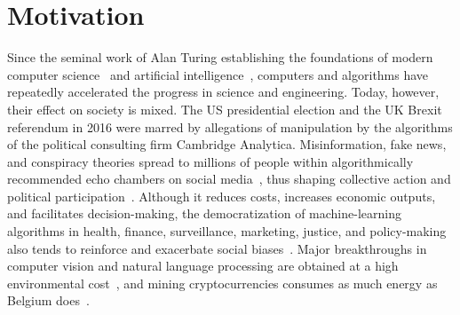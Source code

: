 \section{Motivation}
\label{in:sec:motivation}

Since the seminal work of Alan Turing establishing the foundations of modern computer science~\citep{turing1937computable} and artificial intelligence~\citep{turing2009computing}, computers and algorithms have repeatedly accelerated the progress in science and engineering.
Today, however, their effect on society is mixed.
The US presidential election and the UK Brexit referendum in 2016 were marred by allegations of manipulation by the algorithms of the political consulting firm Cambridge Analytica.
Misinformation, fake news, and conspiracy theories spread to millions of people within algorithmically recommended echo chambers on social media~\citep{kumar2016disinformation,garimella2018political,ribeiro2020auditing,cinelli2021echo}, thus shaping collective action and political participation~\citep{margetts2015political}.
Although it reduces costs, increases economic outputs, and facilitates decision-making, the democratization of machine-learning algorithms in health, finance, surveillance, marketing, justice, and policy-making also tends to reinforce and exacerbate social biases~\citep{hajian2016algorithmic,stoica2018algorithmic,rodolfa2020case}.
Major breakthroughs in computer vision and natural language processing are obtained at a high environmental cost~\citep{strubell2019energy}, and mining cryptocurrencies consumes as much energy as Belgium does~\citep{gallersdorfer2020energy,de2020bitcoin}.

